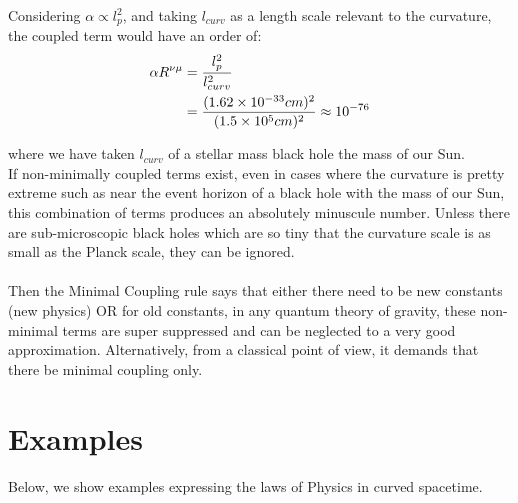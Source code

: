 \documentclass[10pt]{article}
\begin{document}
                Considering $\alpha \propto l_{p}^{2}$, and taking $l_{curv}$ as a length scale relevant to the curvature, the coupled term would have an order of: 
                \begin{align}
                    \alpha R^{\nu \mu} &= \frac{l_{p}^{2}}{l_{curv}^{2}} \notag \\
                    &= \frac{(1.62 \times 10^{-33} cm)^2}{(1.5 \times 10^{5} cm)^{2}} \approx 10^{-76}
                \end{align}
                
                where we have taken $l_{curv}$ of a stellar mass black hole the mass of our Sun. \\ 
                If non-minimally coupled terms exist, even in cases where the curvature is pretty extreme such as near the event horizon of a black hole with the mass of our Sun, this combination of terms produces an absolutely minuscule number. Unless there are sub-microscopic black holes which are so tiny that the curvature scale is as small as the Planck scale, they can be ignored. 
                \\ 
                \\
                Then the Minimal Coupling rule says that either there need to be new constants (new physics) OR for old constants, in any quantum theory of gravity, these non-minimal terms are super suppressed and can be neglected to a very good approximation. Alternatively, from a classical point of view, it demands that there be minimal coupling only. 
        
            \section{Examples}\label{sec:Eg}
                Below, we show examples expressing the laws of Physics in curved spacetime.
\end{document}
